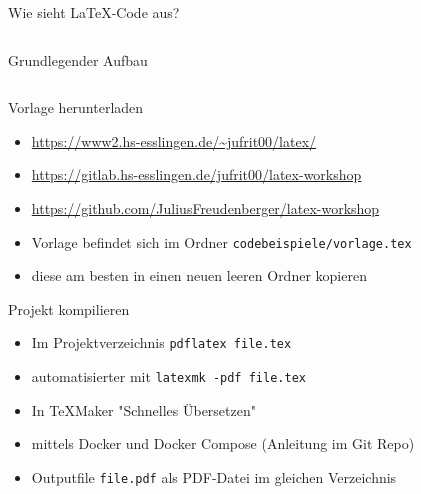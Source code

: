 \documentclass[presentation,aspectratio=169]{beamer}
\begin{document}
\begin{frame}{Wie sieht \LaTeX-Code aus?}
  \inputminted{latex}{codebeispiele/beispiel.tex}
\end{frame}

\begin{frame}{Grundlegender Aufbau}
  \inputminted{latex}{codebeispiele/aufbau.tex}
\end{frame}

\begin{frame}[fragile]{Vorlage herunterladen}
  \begin{itemize}
    \item \href{https://www2.hs-esslingen.de/~jufrit00/latex/}{https://www2.hs-esslingen.de/\textasciitilde{}jufrit00/latex/}
    \item \href{https://gitlab.hs-esslingen.de/jufrit00/latex-workshop}{https://gitlab.hs-esslingen.de/jufrit00/latex-workshop}
    \item \href{https://github.com/JuliusFreudenberger/latex-workshop}{https://github.com/JuliusFreudenberger/latex-workshop}
    \bigskip
    \item Vorlage befindet sich im Ordner \verb|codebeispiele/vorlage.tex|
    \item diese am besten in einen neuen leeren Ordner kopieren
  \end{itemize}
\end{frame}

\begin{frame}[fragile]{Projekt kompilieren}
  \begin{itemize}
    \item Im Projektverzeichnis \verb|pdflatex file.tex|
    \item automatisierter mit \verb|latexmk -pdf file.tex|
    \item In \TeX{}Maker "Schnelles Übersetzen"
    \item mittels Docker und Docker Compose (Anleitung im Git Repo)
    \item Outputfile \verb|file.pdf| als PDF-Datei im gleichen Verzeichnis
  \end{itemize}
\end{frame}
\end{document}
